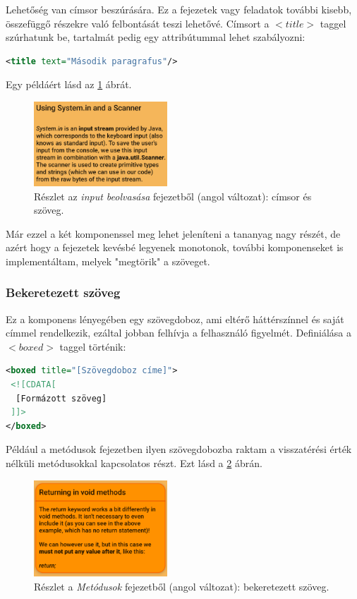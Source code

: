 \documentclass[12pt,a4paper]{article}
\begin{document}
	Lehetőség van címsor beszúrására. Ez a fejezetek vagy feladatok további kisebb, összefüggő részekre való felbontását teszi lehetővé. Címsort a $<title>$ taggel szúrhatunk be, tartalmát pedig egy attribútummal lehet szabályozni:
	
	\bigskip
	\begin{lstlisting}[language=XML]
	<title text="Második paragrafus"/>
	\end{lstlisting}
	\bigskip
	
	Egy példáért lásd az \ref{title_component_figure} ábrát.
	
	\begin{figure}[h!]
		\centering
		\includegraphics[width=5cm]{title_text_component}
		\caption{Részlet az \textit{input beolvasása} fejezetből (angol változat): címsor és szöveg.}
		\label{title_component_figure}
	\end{figure}
	
	Már ezzel a két komponenssel meg lehet jeleníteni a tananyag nagy részét, de azért hogy a fejezetek kevésbé legyenek monotonok, további komponenseket is implementáltam, melyek "megtörik" a szöveget. 
	
	\subsubsection{Bekeretezett szöveg}
	
	Ez a komponens lényegében egy szövegdoboz, ami eltérő háttérszínnel és saját címmel rendelkezik, ezáltal jobban felhívja a felhasználó figyelmét. Definiálása a $<boxed>$ taggel történik:
	
	\bigskip
	\begin{lstlisting}[language=XML]
<boxed title="[Szövegdoboz címe]">
 <![CDATA[
  [Formázott szöveg]
 ]]>
</boxed>	
	\end{lstlisting}
	\bigskip

	Például a metódusok fejezetben ilyen szövegdobozba raktam a visszatérési érték nélküli metódusokkal kapcsolatos részt. Ezt lásd a \ref{boxed_component_figure} ábrán.
	
	\begin{figure}[h!]
		\centering
		\includegraphics[width=5cm]{boxed_component}
		\caption{Részlet a \textit{Metódusok} fejezetből (angol változat): bekeretezett szöveg.}
		\label{boxed_component_figure}
	\end{figure}
	
\end{document}

